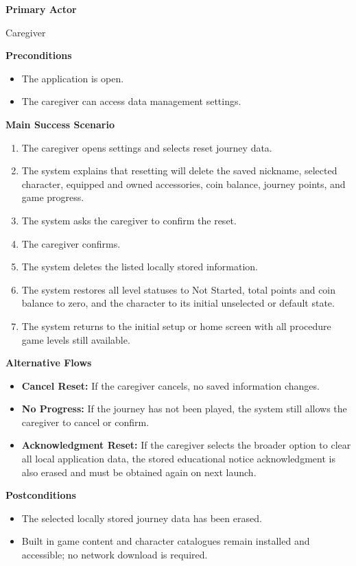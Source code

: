 \documentclass[12pt]{article}
\begin{document}
\textbf{Primary Actor}

Caregiver

\textbf{Preconditions}
\begin{itemize}
    \item The application is open.
    \item The caregiver can access data management settings.
\end{itemize}

\textbf{Main Success Scenario}
\begin{enumerate}
    \item The caregiver opens settings and selects reset journey data.
    \item The system explains that resetting will delete the saved
    nickname, selected character, equipped and owned accessories,
    coin balance, journey points, and game progress.
    \item The system asks the caregiver to confirm the reset.
    \item The caregiver confirms.
    \item The system deletes the listed locally stored information.
    \item The system restores all level statuses to Not Started,
    total points and coin balance to zero, and the character to
    its initial unselected or default state.
    \item The system returns to the initial setup or home screen
    with all procedure game levels still available.
\end{enumerate}

\textbf{Alternative Flows}
\begin{itemize}
    \item \textbf{Cancel Reset:} If the caregiver cancels, no
    saved information changes.
    \item \textbf{No Progress:} If the journey has not been played,
    the system still allows the caregiver to cancel or confirm.
    \item \textbf{Acknowledgment Reset:} If the caregiver selects
    the broader option to clear all local application data,
    the stored educational notice acknowledgment is also erased
    and must be obtained again on next launch.
\end{itemize}

\textbf{Postconditions}
\begin{itemize}
    \item The selected locally stored journey data has been erased.
    \item Built in game content and character catalogues remain
    installed and accessible; no network download is required.
\end{itemize}
\end{document}
